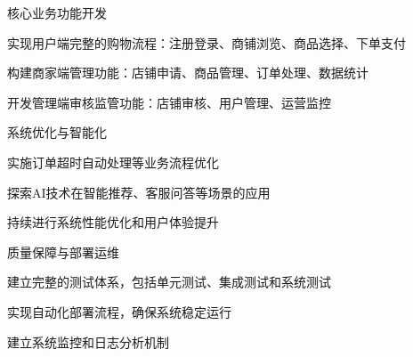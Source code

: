\begin{levellist}
\begin{levellist}
        \item 核心业务功能开发
        \begin{levellist}
            \item 实现用户端完整的购物流程：注册登录、商铺浏览、商品选择、下单支付
            \item 构建商家端管理功能：店铺申请、商品管理、订单处理、数据统计
            \item 开发管理端审核监管功能：店铺审核、用户管理、运营监控
        \end{levellist}

        \item 系统优化与智能化
        \begin{levellist}
            \item 实施订单超时自动处理等业务流程优化
            \item 探索AI技术在智能推荐、客服问答等场景的应用
            \item 持续进行系统性能优化和用户体验提升
        \end{levellist}

        \item 质量保障与部署运维
        \begin{levellist}
            \item 建立完整的测试体系，包括单元测试、集成测试和系统测试
            \item 实现自动化部署流程，确保系统稳定运行
            \item 建立系统监控和日志分析机制
        \end{levellist}

    \end{levellist}

\end{levellist}


